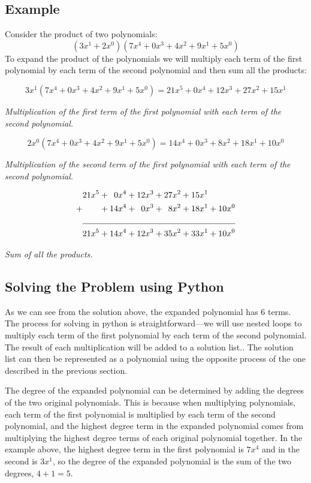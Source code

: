 \documentclass{article}
\begin{document}
\subsection*{Example}
Consider the product of two polynomials:
$$ (3x^1+2x^0)(7x^4 + 0x^3 + 4x^2 + 9x^1 + 5x^0) $$
To expand the product of the polynomials we will multiply each term of the first polynomial by each term of the second polynomial and then sum all the products:

$$ 3x^1(7x^4 + 0x^3 + 4x^2 + 9x^1 + 5x^0) = 21x^5 + 0x^4 + 12x^3 + 27x^2 + 15x^1 $$
\begin{center}
    \textit{Multiplication of the first term of the first polynomial with each term of the second polynomial.}
\end{center}

$$ 2x^0(7x^4 + 0x^3 + 4x^2 + 9x^1 + 5x^0) = 14x^4 + 0x^3 + 8x^2 + 18x^1 + 10x^0 $$
\begin{center}
    \textit{Multiplication of the second term of the first polynomial with each term of the second polynomial.}
\end{center}

\begin{align*}
      & 21x^5 + \phantom{1} 0x^4 + 12x^3 + 27x^2 + 15x^1                              \\
    + & \phantom{21x^5} + 14x^4 + \phantom{1} 0x^3 + \phantom{2} 8x^2 + 18x^1 + 10x^0 \\
    \cline{2-2}
      & 21x^5 + 14x^4 + 12x^3 + 35x^2 + 33x^1 + 10x^0
\end{align*}



\begin{center}
    \textit{Sum of all the products.}
\end{center}

\subsection*{Solving the Problem using Python}
As we can see from the solution above, the expanded polynomial has 6 terms. The process for solving in python is straightforward—we will use nested loops to multiply each term of the first polynomial by each term of the second polynomial. The result of each multiplication will be added to a solution list.. The solution list can then be represented as a polynomial using the opposite process of the one described in the previous section.

The degree of the expanded polynomial can be determined by adding the degrees of the two original polynomials. This is because when multiplying polynomials, each term of the first polynomial is multiplied by each term of the second polynomial, and the highest degree term in the expanded polynomial comes from multiplying the highest degree terms of each original polynomial together. In the example above, the highest degree term in the first polynomial is \( 7x^4 \) and in the second is \( 3x^1 \), so the degree of the expanded polynomial is the sum of the two degrees, \(4 + 1 = 5 \).
\end{document}
